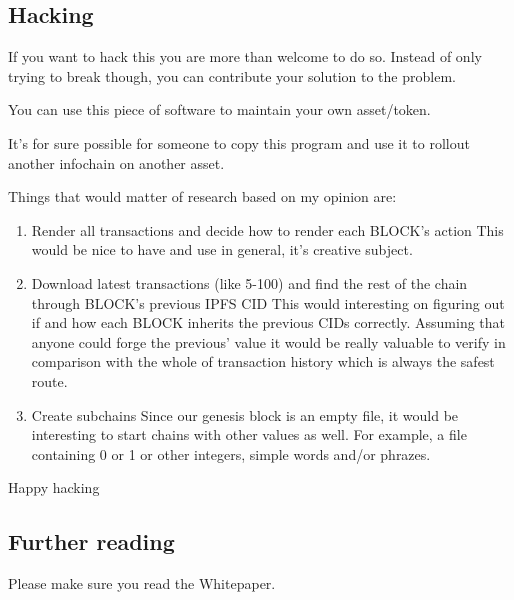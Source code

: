 \hypertarget{hacking}{%
\subsection{Hacking}\label{hacking}}

If you want to hack this you are more than welcome to do so. Instead of
only trying to break though, you can contribute your solution to the
problem.

You can use this piece of software to maintain your own asset/token.

It's for sure possible for someone to copy this program and use it to
rollout another infochain on another asset.

Things that would matter of research based on my opinion are:

\begin{enumerate}
\def\labelenumi{\arabic{enumi}.}
\item
  Render all transactions and decide how to render each BLOCK's action
  This would be nice to have and use in general, it's creative subject.
\item
  Download latest transactions (like 5-100) and find the rest of the
  chain through BLOCK's previous IPFS CID This would interesting on
  figuring out if and how each BLOCK inherits the previous CIDs
  correctly. Assuming that anyone could forge the previous' value it
  would be really valuable to verify in comparison with the whole of
  transaction history which is always the safest route.
\item
  Create subchains Since our genesis block is an empty file, it would be
  interesting to start chains with other values as well. For example, a
  file containing 0 or 1 or other integers, simple words and/or phrazes.
\end{enumerate}

Happy hacking

\hypertarget{further-reading}{%
\subsection{Further reading}\label{further-reading}}

Please make sure you read the Whitepaper.
